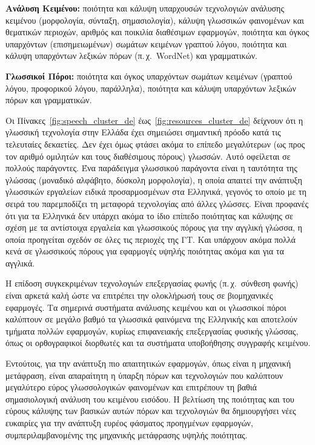 \begin{multicols}{2}
\textbf{Ανάλυση Κειμένου:} ποιότητα και κάλυψη υπαρχουσών τεχνολογιών ανάλυσης κειμένου (μορφολογία, σύνταξη, σημασιολογία), κάλυψη γλωσσικών φαινομένων και θεματικών περιοχών, αριθμός και ποικιλία διαθέσιμων εφαρμογών, ποιότητα και όγκος υπαρχόντων (επισημειωμένων) σωμάτων κειμένων γραπτού λόγου, ποιότητα και κάλυψη υπαρχόντων λεξικών πόρων (π.\,χ.~WordNet) και γραμματικών.

\textbf{Γλωσσικοί Πόροι:} ποιότητα και όγκος υπαρχόντων σωμάτων κειμένων (γραπτού λόγου, προφορικού λόγου, παράλληλα), ποιότητα και κάλυψη υπαρχόντων λεξικών πόρων και γραμματικών.

Οι Πίνακες~\ref{fig:speech_cluster_de} έως~\ref{fig:resources_cluster_de} δείχνουν ότι η γλωσσική τεχνολογία στην Ελλάδα έχει σημειώσει σημαντική πρόοδο κατά τις τελευταίες δεκαετίες. Δεν έχει όμως φτάσει ακόμα το επίπεδο μεγαλύτερων (ως προς τον αριθμό ομιλητών και τους διαθέσιμους πόρους) γλωσσών. Αυτό οφείλεται σε πολλούς παράγοντες. Ένα παράδειγμα γλωσσικού παράγοντα είναι η ταυτότητα της γλώσσας (μοναδικό αλφάβητο, δύσκολη μορφολογία), η οποία απαιτεί την ανάπτυξη γλωσσικών εργαλείων ειδικά προσαρμοσμένων στα Ελληνικά, γεγονός το οποίο με τη σειρά του παρεμποδίζει τη μεταφορά τεχνολογίας από άλλες γλώσσες. Είναι προφανές ότι για τα Ελληνικά δεν υπάρχει ακόμα το ίδιο επίπεδο ποιότητας και κάλυψης σε σχέση με τα αντίστοιχα εργαλεία και γλωσσικούς πόρους για την αγγλική γλώσσα, η οποία προηγείται σχεδόν σε όλες τις περιοχές της ΓΤ. Και υπάρχουν ακόμα πολλά κενά σε γλωσσικούς πόρους για εφαρμογές υψηλής ποιότητας ακόμα και για τα αγγλικά.

Η επίδοση συγκεκριμένων τεχνολογιών επεξεργασίας φωνής (π.\,χ.~σύνθεση φωνής) είναι αρκετά καλή ώστε να επιτρέπει την ολοκλήρωσή τους σε βιομηχανικές εφαρμογές. Τα σημερινά συστήματα ανάλυσης κειμένου και οι γλωσσικοί πόροι καλύπτουν σε μεγάλο βαθμό τα γλωσσικά φαινόμενα της Ελληνικής και αποτελούν τμήματα πολλών εφαρμογών, κυρίως επιφανειακής επεξεργασίας φυσικής γλώσσας, όπως οι ορθογραφικοί διορθωτές και τα συστήματα υποβοήθησης συγγραφής κειμένου.

Εντούτοις, για την ανάπτυξη πιο απαιτητικών εφαρμογών, όπως είναι η μηχανική μετάφραση, είναι απαραίτητη η ύπαρξη πόρων και τεχνολογιών που καλύπτουν μεγαλύτερο εύρος γλωσσολογικών φαινομένων και επιτρέπουν τη βαθιά σημασιολογική ανάλυση του κειμένου εισόδου. Η βελτίωση της ποιότητας και του εύρους κάλυψης των βασικών αυτών πόρων και τεχνολογιών θα δημιουργήσει νέες ευκαιρίες για την ανάπτυξη ευρέος φάσματος προηγμένων εφαρμογών, συμπεριλαμβανομένης της μηχανικής μετάφρασης υψηλής ποιότητας.


\end{multicols}
